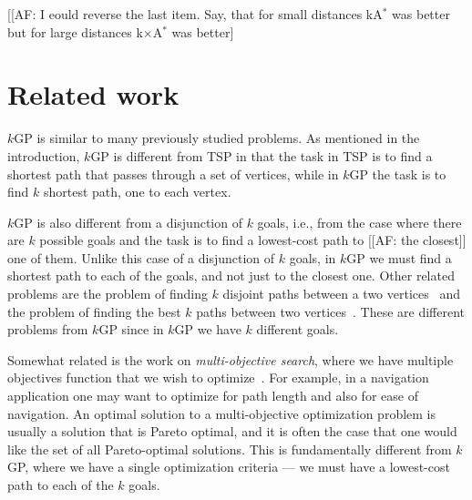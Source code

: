 \documentclass[twoside,11pt]{article}
\newcommand{\kgs}{$k$GP\xspace}
\newcommand{\kastar}{kA$^*$\xspace}
\newcommand{\kxastar}{k$\times$A$^*$\xspace}
\begin{document}
[[AF: I eould reverse the last item. Say, that for small distances \kastar was better but for large distances  \kxastar was better]


\section{Related work}
\label{sec:related-work}

\kgs is similar to many previously studied problems.
As mentioned in the introduction, \kgs is different from TSP in that the task in TSP is to find a
shortest path that passes through a set of vertices, while in \kgs the task is to find $k$ shortest path, one to each vertex.

\kgs is also different from a disjunction of $k$ goals, i.e., from the case where there are $k$ possible goals and the task is to find a lowest-cost path to [[AF: the closest]] one of them.
Unlike this case of a disjunction of $k$ goals, in \kgs we must find a shortest path to each of the goals, and not just to the closest one.
Other related problems are the problem of finding $k$ disjoint paths between a two vertices~\cite{suurballe.jw:disjoint} and the problem of finding the best $k$ paths between two vertices~\cite{pollack.m:letter,Eppstein1998}.
These are different problems from \kgs since in \kgs we have $k$ different goals.

Somewhat related is the work on \emph{multi-objective search}, where we have multiple objectives function that we wish to optimize~\cite{machuca2011analysis}.
For example, in a navigation application one may want to optimize for path length and also for ease of navigation.
An optimal solution to a multi-objective optimization problem is usually a solution that is Pareto optimal, and it is often the case that one would like the set of all Pareto-optimal solutions.
This is fundamentally different from \kgs, where we have a single optimization criteria --- we must have a lowest-cost path to each of the $k$ goals.
\end{document}
